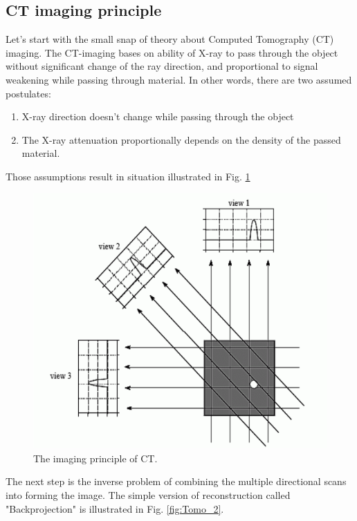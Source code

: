 \documentclass[fleqn,10pt]{SelfArx} %
\begin{document}
\subsection{CT imaging principle}
Let's start with the small snap of theory about Computed Tomography (CT) imaging. The CT-imaging bases on ability of X-ray to pass through the object without significant change of the ray direction, and proportional to signal weakening while passing through material. In other words, there are two assumed postulates:
\begin{enumerate}[noitemsep] %
\item X-ray direction doesn't change while passing through the object
\item The X-ray attenuation proportionally depends on the density of the passed material.
\end{enumerate}

Those assumptions result in situation illustrated in Fig. \ref{fig:Tomo_1}
\begin{figure}[ht]\centering
\includegraphics[width=0.9\linewidth]{Tomo_1}
\caption{The imaging principle of CT.}
\label{fig:Tomo_1}
\end{figure}

The next step is the inverse problem of combining the multiple directional scans into forming the image. The simple version of reconstruction called "Backprojection" is illustrated in Fig. \ref{fig:Tomo_2}.
\end{document}
